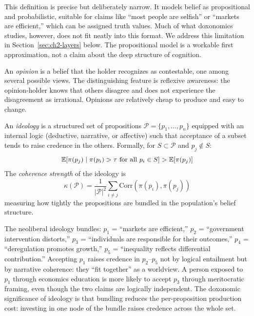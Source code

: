 \begin{remark}
\label{rem:belief-limitations}
This definition is precise but deliberately narrow.
It models belief as propositional and probabilistic, suitable for claims like ``most people are selfish'' or ``markets are efficient,'' which can be assigned truth values.
Much of what doxonomics studies, however, does not fit neatly into this format.
We address this limitation in Section~\ref{sec:ch2-layers} below.
The propositional model is a workable first approximation, not a claim about the deep structure of cognition.
\end{remark}

An \emph{opinion} is a belief that the holder recognizes as contestable, one among several possible views.
The distinguishing feature is reflexive awareness: the opinion-holder knows that others disagree and does not experience the disagreement as irrational.
Opinions are relatively cheap to produce and easy to change.

\begin{definition}[Ideology]
\label{def:ideology}
An \emph{ideology} is a structured set of propositions $\mathcal{P} = \{p_1, \ldots, p_n\}$ equipped with an internal logic (deductive, narrative, or affective) such that acceptance of a subset tends to raise credence in the others.
Formally, for $S \subset \mathcal{P}$ and $p_j \notin S$:
\[
  \mathbb{E}[\pi(p_j) \mid \pi(p_i) > \tau \text{ for all } p_i \in S] > \mathbb{E}[\pi(p_j)]
\]
The \emph{coherence strength} of the ideology is
\[
  \kappa(\mathcal{P}) = \frac{1}{|\mathcal{P}|^2} \sum_{i \neq j} \mathrm{Corr}(\pi(p_i), \pi(p_j))
\]
measuring how tightly the propositions are bundled in the population's belief structure.
\end{definition}

\begin{example}
\label{ex:neoliberal-ideology}
The neoliberal ideology bundles: $p_1$ = ``markets are efficient,'' $p_2$ = ``government intervention distorts,'' $p_3$ = ``individuals are responsible for their outcomes,'' $p_4$ = ``deregulation promotes growth,'' $p_5$ = ``inequality reflects differential contribution.''
Accepting $p_1$ raises credence in $p_2$--$p_5$ not by logical entailment but by narrative coherence: they ``fit together'' as a worldview.
A person exposed to $p_1$ through economics education is more likely to accept $p_3$ through meritocratic framing, even though the two claims are logically independent.
The doxonomic significance of ideology is that bundling reduces the per-proposition production cost: investing in one node of the bundle raises credence across the whole set.
\end{example}

